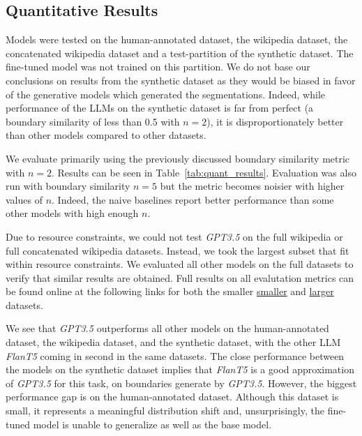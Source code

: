 
\subsection{Quantitative Results}

Models were tested on the human-annotated dataset, the wikipedia dataset, the concatenated wikipedia dataset and a test-partition of the synthetic dataset. The fine-tuned model was not trained on this partition. We do not base our conclusions on results from the synthetic dataset as they would be biased in favor of the generative models which generated the segmentations. Indeed, while performance of the LLMs on the synthetic dataset is far from perfect (a boundary similarity of less than 0.5 with $n=2$), it is disproportionately better than other models compared to other datasets.

We evaluate primarily using the previously discussed boundary similarity metric with $n=2$. Results can be seen in Table~\ref{tab:quant_results}. Evaluation was also run with boundary similarity $n=5$ but the metric becomes noisier with higher values of $n$. Indeed, the naive baselines report better performance than some other models with high enough $n$. 

Due to resource constraints, we could not test \emph{GPT3.5} on the full wikipedia or full concatenated wikipedia datasets. Instead, we took the largest subset that fit within resource constraints. We evaluated all other models on the full datasets to verify that similar results are obtained. Full results on all evalutation metrics can be found online at the following links for both the smaller \href{https://docs.google.com/spreadsheets/d/15CJhNuioTS9L13tXsGfaG54igEF1HB6Os_mnR0k4P-I/edit?usp=sharing}{smaller} and \href{https://docs.google.com/spreadsheets/d/1UorM9wHrSOVURJ5djldZ6y3kCjNMNcQSFEBOALo-HgI/edit?usp=sharing}{larger} datasets.

We see that \emph{GPT3.5} outperforms all other models on the human-annotated dataset, the wikipedia dataset, and the synthetic dataset, with the other LLM \emph{FlanT5} coming in second in the same datasets. The close performance between the models on the synthetic dataset implies that \emph{FlanT5} is a good approximation of \emph{GPT3.5} for this task, on boundaries generate by \emph{GPT3.5}. However, the biggest performance gap is on the human-annotated dataset. Although this dataset is small, it represents a meaningful distribution shift and, unsurprisingly, the fine-tuned model is unable to generalize as well as the base model.

